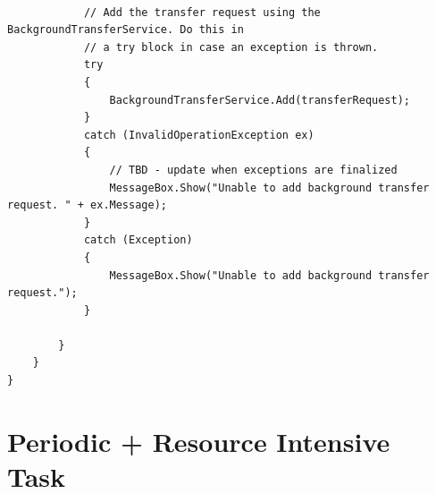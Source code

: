 \documentclass[a4paper,10pt]{scrreprt}
\begin{document}
\begin{lstlisting}[caption=Background File Transfer]
 
            // Add the transfer request using the BackgroundTransferService. Do this in  
            // a try block in case an exception is thrown. 
            try 
            { 
                BackgroundTransferService.Add(transferRequest); 
            } 
            catch (InvalidOperationException ex) 
            { 
                // TBD - update when exceptions are finalized 
                MessageBox.Show("Unable to add background transfer request. " + ex.Message); 
            } 
            catch (Exception) 
            { 
                MessageBox.Show("Unable to add background transfer request."); 
            } 
 
        } 
    } 
} 
\end{lstlisting}
\chapter{Periodic + Resource Intensive Task}
\end{document}
